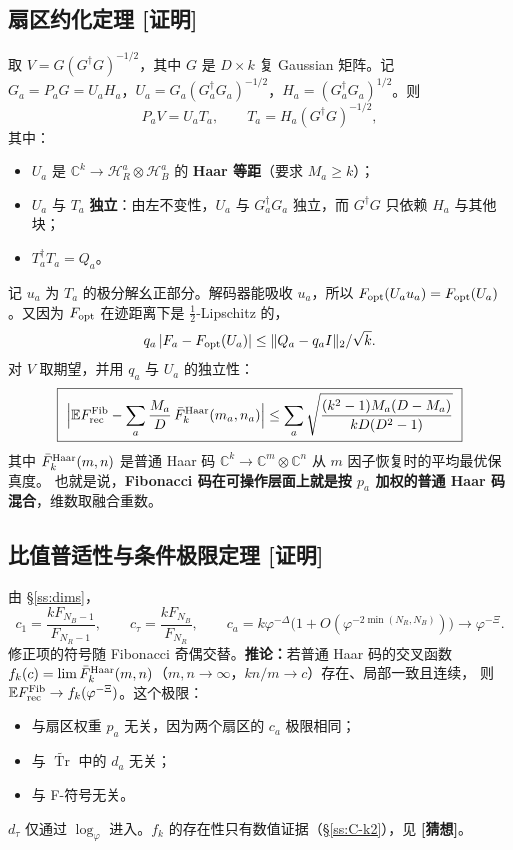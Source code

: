 \documentclass[11pt,a4paper,UTF8]{ctexart}
\newcommand{\tTr}{\widetilde{\operatorname{Tr}}}
\newcommand{\E}{\mathbb{E}}
\newcommand{\tagP}{\texorpdfstring{\textcolor{cP}{\textbf{[证明]}}}{[证明]}}
\newcommand{\tagC}{\texorpdfstring{\textcolor{cC}{\textbf{[猜想]}}}{[猜想]}}
\begin{document}
\subsection{扇区约化定理 \tagP}\label{ss:C-red}
取 $V=G(G^\dagger G)^{-1/2}$，其中 $G$ 是 $D\times k$ 复 Gaussian 矩阵。记 $G_a=P_aG=U_aH_a$，$U_a=G_a(G_a^\dagger G_a)^{-1/2}$，$H_a=(G_a^\dagger G_a)^{1/2}$。则
\[
P_aV=U_aT_a,\qquad T_a=H_a(G^\dagger G)^{-1/2},
\]
其中：
\begin{itemize}
  \item $U_a$ 是 $\mathbb C^k\to\mathcal H^a_R\otimes\mathcal H^a_B$ 的 \textbf{Haar 等距}（要求 $M_a\ge k$）；
  \item $U_a$ 与 $T_a$ \textbf{独立}：由左不变性，$U_a$ 与 $G_a^\dagger G_a$ 独立，而 $G^\dagger G$ 只依赖 $H_a$ 与其他块；
  \item $T_a^\dagger T_a=Q_a$。
\end{itemize}
记 $u_a$ 为 $T_a$ 的极分解幺正部分。解码器能吸收 $u_a$，所以 $F_{\rm opt}(U_au_a)=F_{\rm opt}(U_a)$。又因为 $F_{\rm opt}$ 在迹距离下是 $\tfrac12$-Lipschitz 的，
\[
q_a\,|F_a-F_{\rm opt}(U_a)|\le\|Q_a-q_aI\|_{2}/\sqrt k .
\]
对 $V$ 取期望，并用 $q_a$ 与 $U_a$ 的独立性：
\[
\boxed{\ \Big|\E F^{\rm Fib}_{\rm rec}-\sum_a\frac{M_a}{D}\,\bar F^{\rm Haar}_k(m_a,n_a)\Big|\le\sum_a\sqrt{\frac{(k^2-1)M_a(D-M_a)}{kD(D^2-1)}}\ }
\]
其中 $\bar F^{\rm Haar}_k(m,n)$ 是普通 Haar 码 $\mathbb C^k\to\mathbb C^m\otimes\mathbb C^n$ 从 $m$ 因子恢复时的平均最优保真度。
也就是说，\textbf{Fibonacci 码在可操作层面上就是按 $p_a$ 加权的普通 Haar 码混合}，维数取融合重数。

\subsection{比值普适性与条件极限定理 \tagP}\label{ss:C-univ}
由 \S\ref{ss:dims}，
\[
c_1=\frac{kF_{N_B-1}}{F_{N_R-1}},\qquad c_\tau=\frac{kF_{N_B}}{F_{N_R}},\qquad c_a=k\varphi^{-\Delta}\big(1+O(\varphi^{-2\min(N_R,N_B)})\big)\to\varphi^{-\Xi}.
\]
修正项的符号随 Fibonacci 奇偶交替。\textbf{推论：}若普通 Haar 码的交叉函数 $f_k(c)=\lim\bar F^{\rm Haar}_k(m,n)$（$m,n\to\infty$，$kn/m\to c$）存在、局部一致且连续，
则 $\E F^{\rm Fib}_{\rm rec}\to f_k(\varphi^{-\Xi})$。这个极限：
\begin{itemize}
  \item 与扇区权重 $p_a$ 无关，因为两个扇区的 $c_a$ 极限相同；
  \item 与 $\tTr$ 中的 $d_a$ 无关；
  \item 与 F-符号无关。
\end{itemize}
$d_\tau$ 仅通过 $\log_\varphi$ 进入。$f_k$ 的存在性只有数值证据（\S\ref{ss:C-k2}），见 \tagC。
\end{document}
